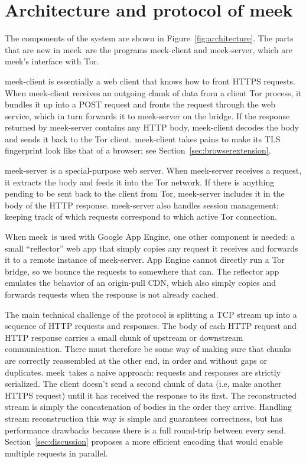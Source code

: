 \documentclass[conference]{IEEEtran}
\newcommand{\meekclient}{\mbox{meek-client}\xspace}
\newcommand{\meekserver}{\mbox{meek-server}\xspace}
\newcommand{\meek}{meek\xspace}
\begin{document}
\section{Architecture and protocol of \meek}
\label{sec:architecture}

The components of the system are shown in Figure~\ref{fig:architecture}.
The parts that are new in \meek\
are the programs \meekclient and \meekserver,
which are \meek's interface with Tor.

\meekclient is essentially a web client that knows how to front HTTPS requests.
When \meekclient receives an outgoing chunk of data from a client Tor process, it bundles it up into a POST request
and fronts the request through the web service,
which in turn forwards it to \meekserver on the bridge.
If the response returned by \meekserver contains any HTTP body,
\meekclient decodes the body and sends it back to the Tor client.
\meekclient takes pains to make its TLS fingerprint
look like that of a browser; see Section~\ref{sec:browserextension}.

\meekserver is a special-purpose web server.
When \meekserver receives a request, it extracts the body and feeds it into
the Tor network.
If there is anything pending to be sent back to the client from Tor,
\meekserver includes it in the body of the HTTP response.
\meekserver also handles session management:
keeping track of which requests correspond to which active Tor connection.

When \meek\ is used with Google App Engine, one other component is needed:
a small ``reflector'' web app that simply copies any request
it receives and forwards it to a remote instance of \meekserver.
App Engine cannot directly run a Tor bridge,
so we bounce the requests to somewhere that can.
The reflector app emulates the behavior of an origin-pull CDN,
which also simply copies and forwards requests
when the response is not already cached.

The main technical challenge of the protocol is splitting a TCP stream up
into a sequence of HTTP requests and responses.
The body of each HTTP request and HTTP response carries
a small chunk of upstream or downstream communication.
There must therefore be some way of making sure that chunks
are correctly reassembled at the other end,
in order and without gaps or duplicates.
\meek\ takes a naive approach: requests and responses are strictly serialized.
The client doesn't send a second chunk of data
(i.e, make another HTTPS request) until it has
received the response to its first.
The reconstructed stream is simply the concatenation
of bodies in the order they arrive.
Handling stream reconstruction this way is simple and guarantees correctness,
but has performance drawbacks because there is a full round-trip
between every send.
Section~\ref{sec:discussion} proposes a more efficient encoding
that would enable multiple requests in parallel.
\end{document}
